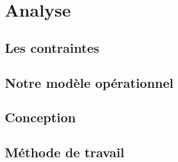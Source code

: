 \part{Analyse}

\clearemptydoublepage
\chapter{Les contraintes}



\clearemptydoublepage
\chapter{Notre modèle opérationnel}



\clearemptydoublepage
\chapter{Conception}
\minitoc



\clearemptydoublepage
\chapter{Méthode de travail}

